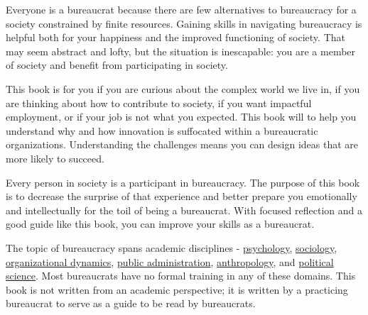 Everyone is a bureaucrat because there are few alternatives to bureaucracy for a society constrained by finite resources. Gaining skills in navigating bureaucracy is helpful both for your happiness and the improved functioning of society. That may seem abstract and lofty, but the situation is inescapable: you are a member of society and benefit from participating in society. 



This book is for you if you are curious about the complex world we live in,  if you are thinking about how to contribute to society,  if you want impactful employment, or if your job is not what you expected. This book will to help you understand why and how innovation is suffocated within a bureaucratic organizations. Understanding the challenges means you can design ideas that are more likely to succeed.


Every person in society is a participant in bureaucracy. The purpose of this book is to decrease the surprise of that experience and better prepare you emotionally and intellectually for the toil of being a bureaucrat. With focused reflection and a good guide like this book, you can improve your skills as a bureaucrat. 

The topic of bureaucracy spans academic disciplines - \href{https://en.wikipedia.org/wiki/Psychology}{psychology},
\iftoggle{WPinmargin}{\marginpar{[Wikipedia] psychology}}{}
\href{https://en.wikipedia.org/wiki/Sociology}{sociology},
\href{https://en.wikipedia.org/wiki/Organizational_behavior}{organizational dynamics},
\href{https://en.wikipedia.org/wiki/Public_administration}{public administration}, 
\href{https://en.wikipedia.org/wiki/Anthropology}{anthropology},
and  
\href{https://en.wikipedia.org/wiki/Political_science}{political science}. 
Most bureaucrats have no formal training in any of these domains. This book is not written from an academic perspective; it is written by a practicing bureaucrat to serve as a guide to be read by bureaucrats. 


